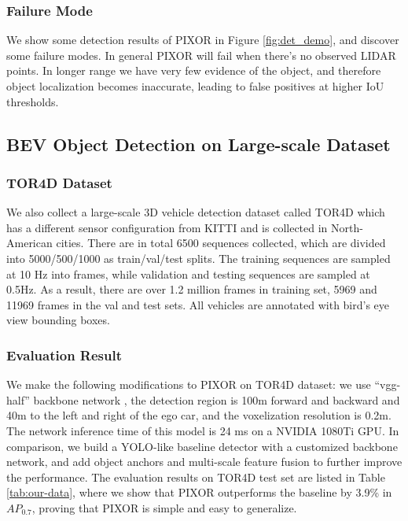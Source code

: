 \vspace{-0.2cm}
\subsubsection{Failure Mode} We show some detection results of PIXOR in Figure \ref{fig:det_demo}, and discover some failure modes. In general PIXOR will fail when there's no observed LIDAR points. In longer range we have very few evidence of the object, and therefore object localization becomes inaccurate, leading to false positives at higher IoU thresholds.

\subsection{BEV Object Detection on Large-scale Dataset}

\subsubsection{TOR4D Dataset}
We also collect a large-scale 3D vehicle detection dataset called TOR4D which has a different sensor configuration from KITTI and is collected in North-American cities. There are in total 6500 sequences collected, which are divided into 5000/500/1000 as train/val/test splits. The training sequences are sampled at 10 Hz into frames, while validation and testing sequences are sampled at 0.5Hz. As a result, there are over 1.2 million frames in training set, 5969 and 11969 frames in the val and test sets. All vehicles are annotated with bird's eye view bounding boxes.

\vspace{-0.2cm}
\subsubsection{Evaluation Result}
We make the following modifications to PIXOR on TOR4D dataset: we use ``vgg-half'' backbone network \cite{mv3d}, the detection region is 100m forward and backward and 40m to the left and right of the ego car, and the voxelization resolution is 0.2m. The network inference time of this model is 24 ms on a NVIDIA 1080Ti GPU. In comparison, we build a YOLO-like \cite{yolo} baseline detector with a customized backbone network, and add object anchors and multi-scale feature fusion to further improve the performance. The evaluation results on TOR4D test set are listed in Table \ref{tab:our-data}, where we show that PIXOR outperforms the baseline by 3.9\% in $AP_{0.7}$, proving that PIXOR is simple and easy to generalize.

